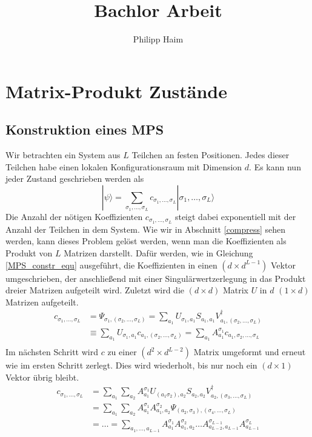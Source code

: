 \documentclass[10pt,a4paper]{report}
\author{Philipp Haim}
\title{Bachlor Arbeit}
\newcommand{\SumIndex}{\sigma_1,\ldots,\sigma_L}
\begin{document}
\maketitle
\tableofcontents

\chapter{Matrix-Produkt Zustände}\label{MPS_chapter}

\section{Konstruktion eines MPS}\label{construction}
Wir betrachten ein System aus $L$ Teilchen an festen Positionen. Jedes dieser Teilchen habe einen lokalen Konfigurationsraum mit Dimension $d$. Es kann nun jeder Zustand geschrieben werden als 
\begin{equation}\label{psi_equ}
|\psi\rangle=\sum_{\SumIndex} c_{\SumIndex}|\SumIndex\rangle
\end{equation}
Die Anzahl der nötigen Koeffizienten $c_{\sigma_1,\ldots,\sigma_L}$ steigt dabei exponentiell mit der Anzahl der Teilchen in dem System.
Wie wir in Abschnitt \ref{compress} sehen werden, kann dieses Problem gelöst werden, wenn man die Koeffizienten als Produkt von $L$ Matrizen darstellt. Dafür werden, wie in Gleichung \ref{MPS_constr_equ} ausgeführt, die Koeffizienten in einen $(d\times d^{L-1})$ Vektor umgeschrieben, der anschließend mit einer Singulärwertzerlegung in das Produkt dreier Matrizen aufgeteilt wird. Zuletzt wird die $(d\times d)$ Matrix $U$ in $d$ $(1\times d)$ Matrizen aufgeteilt. 
\begin{equation}
\label{MPS_constr_equ}
\begin{split}
c_{\SumIndex}&=\Psi_{\sigma_1,(\sigma_2,\ldots,\sigma_L)} =\sum_{a_1}U_{\sigma_1,a_1}S_{a_1,a_1}V^\dagger_{a_1,(\sigma_2,\ldots,\sigma_L)} \\
&\equiv\sum_{a_1}U_{\sigma_1,a_1}c_{a_1,(\sigma_2,\ldots,\sigma_L)}=\sum_{a_1}A_{a_1}^{\sigma_1}c_{a_1,\sigma_2,\ldots,\sigma_L} \\
\end{split}
\end{equation}
Im nächsten Schritt wird $c$ zu einer $(d^2 \times d^{L-2})$ Matrix umgeformt und erneut wie im ersten Schritt zerlegt. Dies wird wiederholt, bis nur noch ein $(d\times 1)$ Vektor übrig bleibt.
\begin{equation}
\label{MPS_fin_equ}
\begin{split}
c_{\SumIndex}&=\sum_{a_1}\sum_{a_2}A_{a_1}^{\sigma_1}U_{(a_1 \sigma_2),a_2}S_{a_2,a_2}V_{a_2,(\sigma_3,\ldots,\sigma_L)}^\dagger\\
&=\sum_{a_1}\sum_{a_2}A_{a_1}^{\sigma_1}A_{a_1,a_2}^{\sigma_2}\Psi_{(a_2,\sigma_3),(\sigma_4,\ldots,\sigma_L)}\\
&=\ldots=\sum_{a_1,\ldots,a_{L-1}}A_{a_1}^{\sigma_1}A_{a_1,a_2}^{\sigma_2}\ldots A_{a_{L-2},a_{L-1}}^{\sigma_{L-1}}A_{a_{L-1}}^{\sigma_L}
\end{split}
\end{equation}
\end{document}
